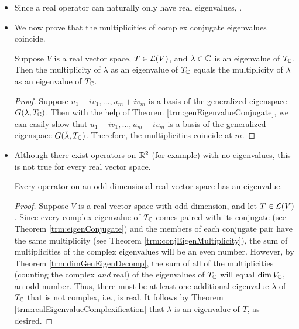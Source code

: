 \documentclass[../main.tex]{subfiles}
\begin{document}
\begin{itemize}
\begin{theorem}
        \begin{proof}
            Take $j=1$ in Theorem \ref{trm:genEigenvalueConjugate}.
        \end{proof}
    \end{theorem}
    \item Since a real operator can naturally only have real eigenvalues, .
    \item We now prove that the multiplicities of complex conjugate eigenvalues coincide.
    \begin{theorem}\label{trm:conjEigenMultiplicity}
        Suppose $V$ is a real vector space, $T\in\mathcal{L}(V)$, and $\lambda\in\mathbb{C}$ is an eigenvalue of $T_{\mathbb{C}}$. Then the multiplicity of $\lambda$ as an eigenvalue of $T_{\mathbb{C}}$ equals the multiplicity of $\bar{\lambda}$ as an eigenvalue of $T_{\mathbb{C}}$.
        \begin{proof}
            Suppose $u_1+iv_1,\dots,u_m+iv_m$ is a basis of the generalized eigenspace $G(\lambda,T_{\mathbb{C}})$. Then with the help of Theorem \ref{trm:genEigenvalueConjugate}, we can easily show that $u_1-iv_1,\dots,u_m-iv_m$ is a basis of the generalized eigenspace $G(\bar{\lambda},T_{\mathbb{C}})$. Therefore, the multiplicities coincide at $m$.
        \end{proof}
    \end{theorem}
    \item Although there exist operators on $\mathbb{R}^2$ (for example) with no eigenvalues, this is not true for every real vector space.
    \begin{theorem}
        Every operator on an odd-dimensional real vector space has an eigenvalue.
        \begin{proof}
            Suppose $V$ is a real vector space with odd dimension, and let $T\in\mathcal{L}(V)$. Since every complex eigenvalue of $T_{\mathbb{C}}$ comes paired with its conjugate (see Theorem \ref{trm:eigenConjugate}) and the members of each conjugate pair have the same multiplicity (see Theorem \ref{trm:conjEigenMultiplicity}), the sum of multiplicities of the complex eigenvalues will be an even number. However, by Theorem \ref{trm:dimGenEigenDecomp}, the sum of all of the multiplicities (counting the complex \emph{and} real) of the eigenvalues of $T_{\mathbb{C}}$ will equal $\dim V_{\mathbb{C}}$, an odd number. Thus, there must be at least one additional eigenvalue $\lambda$ of $T_{\mathbb{C}}$ that is not complex, i.e., is real. It follows by Theorem \ref{trm:realEigenvalueComplexification} that $\lambda$ is an eigenvalue of $T$, as desired.

\end{proof}
\end{theorem}
\end{itemize}
\end{document}
